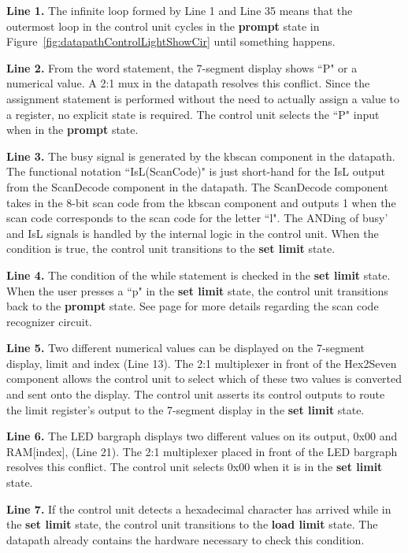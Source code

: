 \textbf{ Line 1.} The infinite loop formed by Line 1 and Line 35 means that the outermost loop
in the control unit cycles in the \textbf{ prompt} state in Figure~\ref{fig:datapathControlLightShowCir}
until something happens.

\textbf{ Line 2.} From the word statement, the 7-segment display shows ``P" or a numerical value.
A 2:1 mux in the datapath resolves this conflict. Since the assignment statement
is performed without the need to actually assign a value to a register, no
explicit state is required.  The control unit selects the ``P" input when in the
\textbf{ prompt} state.

\textbf{ Line 3.} The busy signal is generated by the kbscan component in the datapath.
The functional notation ``IsL(ScanCode)" is just short-hand for the IsL output from
the ScanDecode component in the datapath.  The ScanDecode component takes in the
8-bit scan code from the kbscan component and outputs 1 when the scan code corresponds
to the scan code for the letter ``l".  The ANDing of busy' and IsL signals is handled
by the internal logic in the control unit.  When the condition is true, the control
unit transitions to the \textbf{ set limit} state.

\textbf{ Line 4.} The condition of the while statement is checked in the \textbf{ set limit}
state.  When the user presses a ``p" in the \textbf{ set limit} state, the control
unit transitions back to the \textbf{ prompt} state.  See page \pageref{page:IsScan}
for more details regarding the scan code recognizer circuit.

\textbf{ Line 5.} Two different numerical values can be displayed on the
7-segment display, limit and index (Line 13).  The 2:1 multiplexer in front of
the Hex2Seven component allows the control unit to select which of these two values is
converted and sent onto the display.  The control unit asserts its control
outputs to route the limit register's output to the 7-segment display in
the \textbf{ set limit} state.

\textbf{ Line 6.} The LED bargraph displays two different values on its output, 0x00 and
RAM[index], (Line 21).  The 2:1 multiplexer placed in front of the LED bargraph
resolves this conflict.  The control unit selects 0x00 when it is in the
\textbf{ set limit} state.

\textbf{ Line 7.} If the control unit detects a hexadecimal character has arrived while
in the \textbf{ set limit} state, the control unit transitions to the \textbf{ load
limit} state.  The datapath already contains the hardware necessary to check
this condition.

